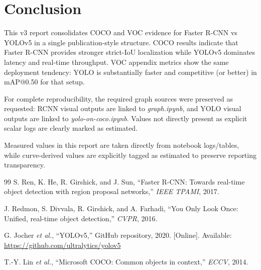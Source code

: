 \documentclass[conference]{IEEEtran}
\begin{document}
\section{Conclusion}
This v3 report consolidates COCO and VOC evidence for Faster R-CNN vs YOLOv5 in a single publication-style structure. COCO results indicate that Faster R-CNN provides stronger strict-IoU localization while YOLOv5 dominates latency and real-time throughput. VOC appendix metrics show the same deployment tendency: YOLO is substantially faster and competitive (or better) in mAP@0.50 for that setup.

For complete reproducibility, the required graph sources were preserved as requested: RCNN visual outputs are linked to \textit{graph.ipynb}, and YOLO visual outputs are linked to \textit{yolo-on-coco.ipynb}. Values not directly present as explicit scalar logs are clearly marked as estimated.

Measured values in this report are taken directly from notebook logs/tables, while curve-derived values are explicitly tagged as estimated to preserve reporting transparency.

\begin{thebibliography}{99}
S. Ren, K. He, R. Girshick, and J. Sun, ``Faster R-CNN: Towards real-time object detection with region proposal networks,'' \emph{IEEE TPAMI}, 2017.

J. Redmon, S. Divvala, R. Girshick, and A. Farhadi, ``You Only Look Once: Unified, real-time object detection,'' \emph{CVPR}, 2016.

G. Jocher \emph{et al.}, ``YOLOv5,'' GitHub repository, 2020. [Online]. Available: \url{https://github.com/ultralytics/yolov5}

T.-Y. Lin \emph{et al.}, ``Microsoft COCO: Common objects in context,'' \emph{ECCV}, 2014.
\end{thebibliography}
\end{document}
